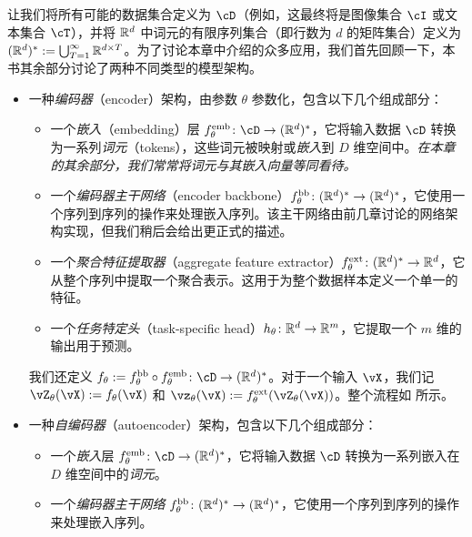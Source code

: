 \documentclass[../../book-main.tex]{subfiles}
\begin{document}
让我们将所有可能的数据集合定义为 \(\cD\)（例如，这最终将是图像集合 \(\cI\) 或文本集合 \(\cT\)），并将 \(\mathbb{R}^{d}\) 中词元的有限序列集合（即行数为 \(d\) 的矩阵集合）定义为 \((\mathbb{R}^{d})^{*} := \bigcup_{T = 1}^{\infty}\mathbb{R}^{d \times T}\)。为了讨论本章中介绍的众多应用，我们首先回顾一下，本书其余部分讨论了两种不同类型的模型架构。
\begin{itemize}
    \item 一种\textit{编码器}（encoder）架构，由参数 \(\theta\) 参数化，包含以下几个组成部分：
    \begin{itemize}
        \item 一个\textit{嵌入}（embedding）层 \(f_{\theta}^{\emb} \colon \cD \to (\R^{d})^{*}\)，它将输入数据 \(\cD\) 转换为一系列\textit{词元}（tokens），这些词元被映射或\textit{嵌入}到 \(D\) 维空间中。\textit{在本章的其余部分，我们常常将词元与其嵌入向量等同看待。}
        \item 一个\textit{编码器主干网络}（encoder backbone）\(f_{\theta}^{\mathrm{bb}} \colon (\mathbb{R}^{d})^{*} \to (\mathbb{R}^{d})^{*}\)，它使用一个序列到序列的操作来处理嵌入序列。该主干网络由前几章讨论的网络架构实现，但我们稍后会给出更正式的描述。
        \item 一个\textit{聚合特征提取器}（aggregate feature extractor）\(f_{\theta}^{\mathrm{ext}} \colon (\mathbb{R}^{d})^{*} \to \mathbb{R}^{d}\)，它从整个序列中提取一个聚合表示。这用于为整个数据样本定义一个单一的特征。
        \item 一个\textit{任务特定头}（task-specific head）\(h_{\theta} \colon \mathbb{R}^{d} \to \mathbb{R}^{m}\)，它提取一个 \(m\) 维的输出用于预测。
    \end{itemize}
    我们还定义 \(f_{\theta} := f_{\theta}^{\backbone} \circ f_{\theta}^{\emb} \colon \cD \to (\R^{d})^{*}\)。对于一个输入 \(\vX\)，我们记 \(\vZ_{\theta}(\vX) := f_{\theta}(\vX)\) 和 \(\vz_{\theta}(\vX) := f_{\theta}^{\ext}(\vZ_{\theta}(\vX))\)。整个流程如  所示。
    \item 一种\textit{自编码器}（autoencoder）架构，包含以下几个组成部分：
    \begin{itemize}
        \item 一个\textit{嵌入}层 \(f_{\theta}^{\emb} \colon \cD \to (\R^{d})^{*}\)，它将输入数据 \(\cD\) 转换为一系列嵌入在 \(D\) 维空间中的\textit{词元}。
        \item 一个\textit{编码器主干网络} \(f_{\theta}^{\mathrm{bb}} \colon (\mathbb{R}^{d})^{*} \to (\mathbb{R}^{d})^{*}\)，它使用一个序列到序列的操作来处理嵌入序列。

\end{itemize}
\end{itemize}
\end{document}
